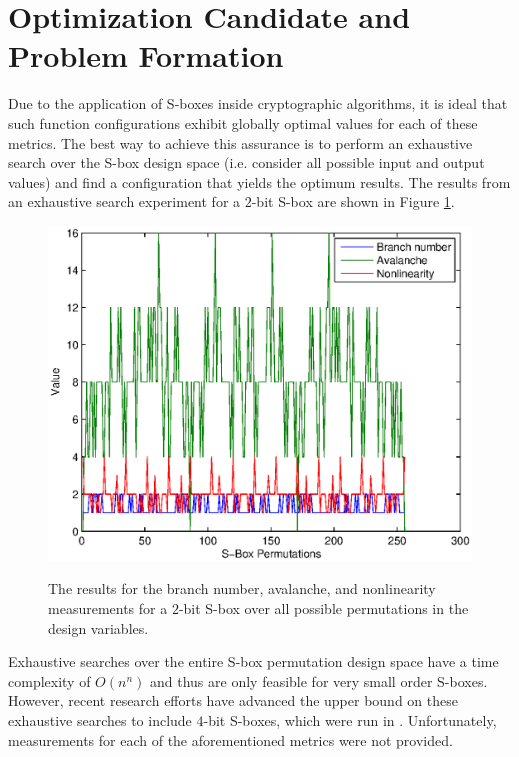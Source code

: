\documentclass[11pt]{article}
\begin{document}
\section{Optimization Candidate and Problem Formation}

Due to the application of S-boxes inside cryptographic algorithms, it is ideal that such function configurations exhibit globally optimal values for each of these metrics. The best way to achieve this assurance is to perform an exhaustive search over the S-box design space (i.e. consider all possible input and output values) and find a configuration that yields the optimum results. The results from an exhaustive search experiment for a $2$-bit S-box are shown in Figure \ref{bfjoint}.
\begin{figure}
	\centering
	\includegraphics[scale=0.65]{images/brute_joint.eps} \\
	\label{bfjoint}
	\caption{The results for the branch number, avalanche, and nonlinearity measurements for a $2$-bit S-box over all possible permutations in the design variables.}
\end{figure}
Exhaustive searches over the entire S-box permutation design space have a time complexity of $O(n^n)$ and thus are only feasible for very small order S-boxes. However, recent research efforts have advanced the upper bound on these exhaustive searches to include $4$-bit S-boxes, which were run in \cite{Sbox4x4}. Unfortunately, measurements for each of the aforementioned metrics were not provided. 
\end{document}

